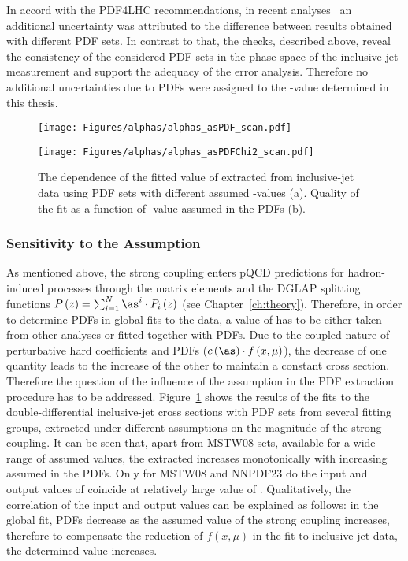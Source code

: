 In accord with the PDF4LHC recommendations, in recent analyses~\cite{thesis:britzger:2013} an additional uncertainty was attributed to the difference between results obtained with different PDF sets. In contrast to that, the checks, described above, reveal the consistency of the considered PDF sets in the phase space of the inclusive-jet measurement and support the adequacy of the  error analysis. Therefore no additional uncertainties due to PDFs were assigned to the \asz-value determined in this thesis. 
\begin{figure}[t]
 \centering
\begin{subfloat}[]{\texttt{[image: Figures/alphas/alphas\_asPDF\_scan.pdf]}
   \label{fig:aschi2scanpdf_a}
 }%
\end{subfloat}
\begin{subfloat}[]{\texttt{[image: Figures/alphas/alphas\_asPDFChi2\_scan.pdf]}
   \label{fig:aschi2scanpdf_b}
 }%
\end{subfloat}
 \caption{The dependence of the fitted value of \asz extracted from inclusive-jet data using PDF sets with different assumed \asz-values (a). Quality of the fit as a function of \asz-value assumed in the PDFs (b).}
 \label{fig:aschi2scanpdf}
\end{figure}
\subsubsection{Sensitivity to the \asz Assumption}
\label{subsec:asassump}
As mentioned above, the strong coupling enters pQCD predictions for hadron-induced processes through the matrix elements and the DGLAP splitting functions $P\left(z\right)=\sum_{i=1}^{N}{\as^i\cdot P_i\left(z\right)}$ (see Chapter~\ref{ch:theory}). Therefore, in order to determine PDFs in global fits to the data, a value of \asz has to be either taken from other analyses or fitted together with PDFs. Due to the coupled nature of perturbative hard coefficients and PDFs ($c\left(\as\right)\cdot f\left(x,\mu\right)$), the decrease of one quantity leads to the increase of the other to maintain a constant cross section. Therefore the question of the influence of the \asz assumption in the PDF extraction procedure has to be addressed. Figure~\ref{fig:aschi2scanpdf} shows the results of the \asz fits to the double-differential inclusive-jet cross sections with PDF sets from several fitting groups, extracted under different assumptions on the magnitude of the strong coupling. It can be seen that, apart from MSTW08 sets, available for a wide range of assumed \asz values, the extracted \asz increases monotonically with increasing \asz assumed in the PDFs. Only for MSTW08 and NNPDF23 do the input and output values of \asz coincide at relatively large value of \as. Qualitatively, the correlation of the input and output values can be explained as follows: in the global fit, PDFs decrease as the assumed value of the strong coupling increases, therefore to compensate the reduction of $f\left(x,\mu\right)$ in the fit to inclusive-jet data, the determined \asz value increases.

